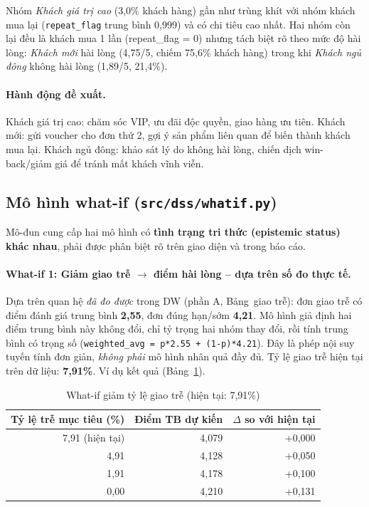 \documentclass[12pt,a4paper]{article}
\newcommand{\code}[1]{\texttt{\small #1}}
\begin{document}
Nhóm \emph{Khách giá trị cao} (3,0\% khách hàng) gần như trùng khít với nhóm khách mua lại (\code{repeat\_flag}
trung bình 0,999) và có chi tiêu cao nhất. Hai nhóm còn lại đều là khách mua 1 lần (repeat\_flag = 0) nhưng
tách biệt rõ theo mức độ hài lòng: \emph{Khách mới} hài lòng (4,75/5, chiếm 75,6\% khách hàng) trong khi
\emph{Khách ngủ đông} không hài lòng (1,89/5, 21,4\%).

\paragraph{Hành động đề xuất.} Khách giá trị cao: chăm sóc VIP, ưu đãi độc quyền, giao hàng ưu tiên. Khách
mới: gửi voucher cho đơn thứ 2, gợi ý sản phẩm liên quan để biến thành khách mua lại. Khách ngủ đông: khảo sát
lý do không hài lòng, chiến dịch win-back/giảm giá để tránh mất khách vĩnh viễn.

\subsection{Mô hình what-if (\code{src/dss/whatif.py})}

Mô-đun cung cấp hai mô hình có \textbf{tình trạng tri thức (epistemic status) khác nhau}, phải được phân biệt
rõ trên giao diện và trong báo cáo.

\paragraph{What-if 1: Giảm giao trễ \(\to\) điểm hài lòng -- dựa trên số đo thực tế.}
Dựa trên quan hệ \emph{đã đo được} trong DW (phần A, Bảng~giao trễ): đơn giao trễ có điểm đánh giá trung bình
\textbf{2,55}, đơn đúng hạn/sớm \textbf{4,21}. Mô hình giả định hai điểm trung bình này không đổi, chỉ tỷ
trọng hai nhóm thay đổi, rồi tính trung bình có trọng số
(\code{weighted\_avg = p*2.55 + (1-p)*4.21}). Đây là phép nội suy tuyến tính đơn giản, \emph{không phải} mô
hình nhân quả đầy đủ. Tỷ lệ giao trễ hiện tại trên dữ liệu: \textbf{7,91\%}. Ví dụ kết quả (Bảng~\ref{tab:whatif-delivery}).

\begin{table}[h]
\centering
\caption{What-if giảm tỷ lệ giao trễ (hiện tại: 7,91\%)}\label{tab:whatif-delivery}
\small
\begin{tabular}{@{}r r r@{}}
\toprule
\textbf{Tỷ lệ trễ mục tiêu (\%)} & \textbf{Điểm TB dự kiến} & \textbf{\(\Delta\) so với hiện tại}\\
\midrule
7,91 (hiện tại) & 4,079 & +0,000\\
4,91 & 4,128 & +0,050\\
1,91 & 4,178 & +0,100\\
0,00 & 4,210 & +0,131\\
\bottomrule
\end{tabular}
\end{table}
\end{document}
